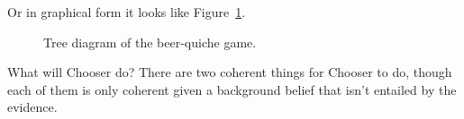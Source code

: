 \documentclass[
  12pt,
  letterpaper,
  DIV=11,
  numbers=noendperiod]{scrreprt}
\begin{document}
Or in graphical form it looks like Figure~\ref{fig-cho-kreps}.

\begin{figure}


\caption{\label{fig-cho-kreps}Tree diagram of the beer-quiche game.}

\end{figure}%

What will Chooser do? There are two coherent things for Chooser to do,
though each of them is only coherent given a background belief that
isn't entailed by the evidence.
\end{document}
